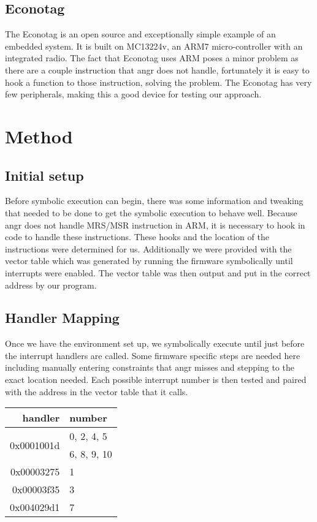 \documentclass[letterpaper, 10 pt, conference]{ieeeconf}
\begin{document}

\subsection{Econotag} \label{econotag}%
The Econotag \cite{etag} is an open source and exceptionally simple example of an embedded system. It is built on MC13224v, an ARM7 micro-controller with an integrated radio. The fact that Econotag uses ARM poses a minor problem as there are a couple instruction that angr does not handle, fortunately it is easy to hook a function to those instruction, solving the problem. The Econotag has very few peripherals, making this a good device for testing our approach.

\section{Method} \label{mthd}
\subsection{Initial setup} \label{setup}
Before symbolic execution can begin, there was some information and tweaking that needed to be done to get the symbolic execution to behave well. Because angr does not handle MRS/MSR instruction in ARM, it is necessary to hook in code to handle these instructions. These hooks and the location of the instructions were determined for us. Additionally we were provided with the vector table which was generated by running the firmware symbolically until interrupts were enabled. %
The vector table was then output and put in the correct address by our program. 

\subsection{Handler Mapping} \label{mapping}
Once we have the environment set up, we symbolically execute until just before the interrupt handlers are called. Some firmware specific steps are needed here including manually entering constraints that angr misses and stepping to the exact location needed. Each possible interrupt number is then tested and paired with the address in the vector table that it calls.

\begin{table}[h]
\centering
\begin{tabular}{r|l}
handler & number \\ \hline
\multirow{2}{*}{0x0001001d} & 0, 2, 4, 5 \\ & 6, 8, 9, 10 \\
0x00003275 & 1 \\
0x00003f35& 3 \\
0x004029d1 & 7 \\
\end{tabular}
\end{table}
\end{document}
